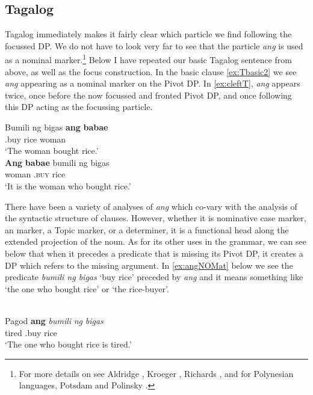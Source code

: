 \documentclass[output=paper]{langsci/langscibook}
\begin{document}
\subsection{Tagalog}

Tagalog immediately makes it fairly clear which particle we find following the
focussed DP.  We do not have to look very far to see that the particle
\emph{ang} is used as a nominal marker.\footnote{For more details on 
see Aldridge \citeyearpar{Aldridge:2013}, Kroeger \citeyearpar{Kroeger:1993},
Richards \citeyearpar{Richards:1998a}, and for Polynesian languages, Potsdam
and Polinsky \citeyearpar{Potsdam:2011a}.} Below I have repeated our basic
Tagalog sentence from above, as well as the focus construction.  In the basic
clause  \eqref{ex:Tbasic2} we see \emph{ang} appearing as a nominal marker on the
Pivot DP.  In  \eqref{ex:cleftT}, \emph{ang} appears twice, once before the now
focussed and fronted Pivot DP, and once following this DP acting as the
focussing particle.\newpage

\ea {}
    \ea
    \gll Bumili ng bigas \textbf{ang} \textbf{babae} \label{ex:Tbasic2}\\
    \At{}.buy \Acc{} rice \Nom{} woman\\
    \glt `The woman bought rice.'\\
    \ex
    \gll  \textbf{Ang} \textbf{babae}  bumili ng bigas\label{ex:cleftT}\\
    \Nom{} woman \Nom{} \At.\textsc{buy} \Acc{} rice\\
    \glt `It is the woman who bought rice.'
    \z
\z

There have been a variety of analyses of \emph{ang} which co-vary with the
analysis of the syntactic structure of  clauses.  However, whether it is
nominative case marker, an  marker, a Topic marker, or a
determiner, it is a functional head along the extended projection of the noun.
As for its other uses in the grammar, we can see below that when it precedes a
predicate that is missing its Pivot DP, it creates a DP which refers to the
missing argument.  In \eqref{ex:angNOMat} below we see the predicate \emph{bumili
ng bigas} `buy rice' preceded by \emph{ang} and it means something like `the
one who bought rice' or `the rice-buyer'.


\ea {}\\
    \gll Pagod \textbf{ang} \emph{bumili} \emph{ng} \emph{bigas}\label{ex:angNOMat}\\
    tired \Nom{} \At{}.buy \Acc{} rice\\
    \glt `The one who bought rice is tired.'
\z
\end{document}
